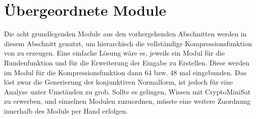 \section{Übergeordnete Module}
\label{sec:knf:module}

Die acht grundlegenden Module aus den vorhergehenden Abschnitten werden in diesem Abschnitt genutzt,
um hierarchisch die vollständige Kompressionsfunktion von  zu erzeugen. Eine einfache Lösung wäre es,
jeweils ein Modul für die Rundenfunktion und für die Erweiterung der Eingabe zu Erstellen. Diese werden
im Modul für die Kompressionsfunktion dann 64 bzw. 48 mal eingebunden. Das löst zwar die Generierung der konjunktiven
Normalform, ist jedoch für eine Analyse unter Umständen zu grob. Sollte es gelingen, Wissen mit CryptoMiniSat zu erwerben,
und einzelnen Modulen zuzuordnen, müsste eine weitere Zuordnung innerhalb des Moduls per Hand erfolgen.

